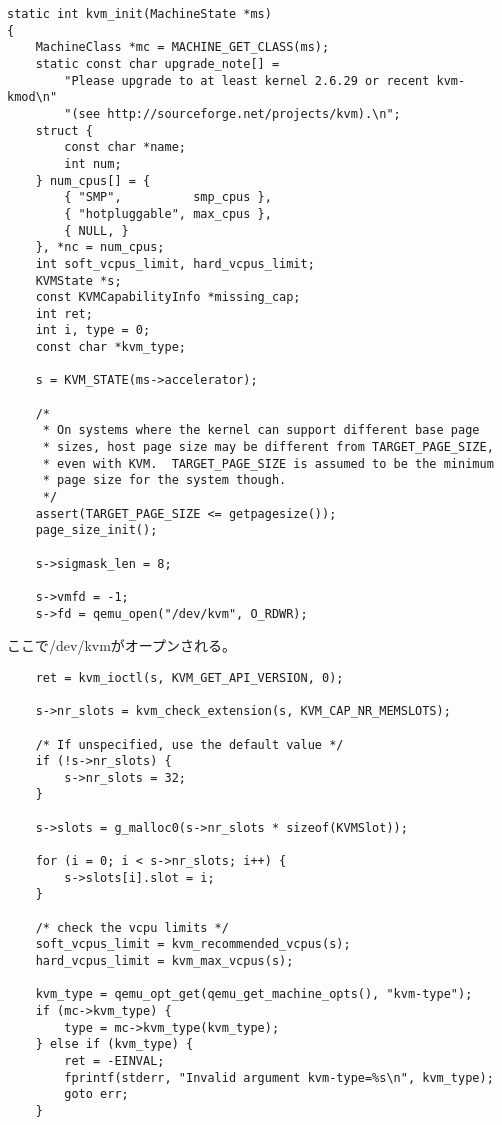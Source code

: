 \documentclass[9pt,b5paper,tombo]{jsbook}
\begin{document}
\begin{lstlisting}
static int kvm_init(MachineState *ms)
{
    MachineClass *mc = MACHINE_GET_CLASS(ms);
    static const char upgrade_note[] =
        "Please upgrade to at least kernel 2.6.29 or recent kvm-kmod\n"
        "(see http://sourceforge.net/projects/kvm).\n";
    struct {
        const char *name;
        int num;
    } num_cpus[] = {
        { "SMP",          smp_cpus },
        { "hotpluggable", max_cpus },
        { NULL, }
    }, *nc = num_cpus;
    int soft_vcpus_limit, hard_vcpus_limit;
    KVMState *s;
    const KVMCapabilityInfo *missing_cap;
    int ret;
    int i, type = 0;
    const char *kvm_type;

    s = KVM_STATE(ms->accelerator);

    /*
     * On systems where the kernel can support different base page
     * sizes, host page size may be different from TARGET_PAGE_SIZE,
     * even with KVM.  TARGET_PAGE_SIZE is assumed to be the minimum
     * page size for the system though.
     */
    assert(TARGET_PAGE_SIZE <= getpagesize());
    page_size_init();

    s->sigmask_len = 8;

    s->vmfd = -1;
    s->fd = qemu_open("/dev/kvm", O_RDWR);
\end{lstlisting}

ここで/dev/kvmがオープンされる。

\begin{lstlisting}
    ret = kvm_ioctl(s, KVM_GET_API_VERSION, 0);

    s->nr_slots = kvm_check_extension(s, KVM_CAP_NR_MEMSLOTS);

    /* If unspecified, use the default value */
    if (!s->nr_slots) {
        s->nr_slots = 32;
    }

    s->slots = g_malloc0(s->nr_slots * sizeof(KVMSlot));

    for (i = 0; i < s->nr_slots; i++) {
        s->slots[i].slot = i;
    }

    /* check the vcpu limits */
    soft_vcpus_limit = kvm_recommended_vcpus(s);
    hard_vcpus_limit = kvm_max_vcpus(s);

    kvm_type = qemu_opt_get(qemu_get_machine_opts(), "kvm-type");
    if (mc->kvm_type) {
        type = mc->kvm_type(kvm_type);
    } else if (kvm_type) {
        ret = -EINVAL;
        fprintf(stderr, "Invalid argument kvm-type=%s\n", kvm_type);
        goto err;
    }
\end{lstlisting}
\end{document}
